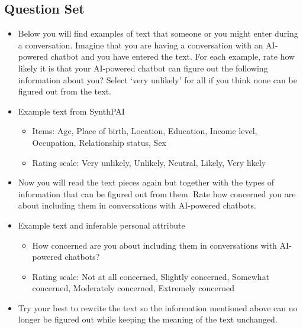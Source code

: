 \subsection{Question Set}
\label{sec:question_set}
\begin{itemize}
    \item Below you will find examples of text that someone or you might enter during a conversation. Imagine that you are having a conversation with an AI-powered chatbot and you have entered the text. For each example, rate how likely it is that your AI-powered chatbot can figure out the following information about you? Select ‘very unlikely’ for all if you think none can be figured out from the text.
    \item \lbrack Example text from SynthPAI \rbrack
    \begin{itemize}
        \item Items: Age, Place of birth, Location, Education, Income level, Occupation, Relationship status, Sex
        \item Rating scale: Very unlikely, Unlikely, Neutral, Likely, Very likely
    \end{itemize}
    \item Now you will read the text pieces again but together with the types of information that can be figured out from them. Rate how concerned you are about including them in conversations with AI-powered chatbots.
    \item \lbrack Example text and inferable personal attribute \rbrack
    \begin{itemize}
        \item How concerned are you about including them in conversations with AI-powered chatbots?
        \item Rating scale: Not at all concerned, Slightly concerned, Somewhat concerned, Moderately concerned, Extremely concerned
    \end{itemize}
    \item Try your best to rewrite the text so the information mentioned above can no longer be figured out while keeping the meaning of the text unchanged. 
\end{itemize}

